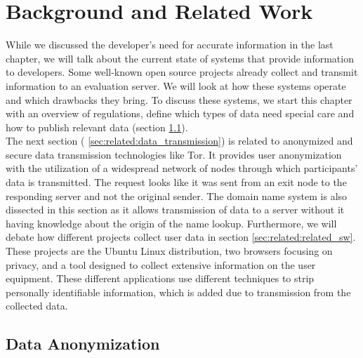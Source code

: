 \chapter{Background and Related Work}
\label{chap:related_work}
%

While we discussed the developer's need for accurate information in the last chapter, we will talk about the current state of systems that provide information to developers. Some well-known open source projects already collect and transmit information to an evaluation server. We will look at how these systems operate and which drawbacks they bring.
To discuss these systems, we start this chapter with an overview of regulations, define which types of data need special care and how to publish relevant data (section \ref{sec:related:data_aononymization}).\\ 
The next section ( \ref{sec:related:data_transmission}) is related to anonymized and secure data transmission technologies like Tor. It provides user anonymization with the utilization of a widespread network of nodes through which participants' data is transmitted. The request looks like it was sent from an exit node to the responding server and not the original sender. The domain name system is also dissected in this section as it allows transmission of data to a server without it having knowledge about the origin of the name lookup.
Furthermore, we will debate how different projects collect user data in section \ref{sec:related:related_sw}. These projects are the Ubuntu Linux distribution, two browsers focusing on privacy, and a tool designed to collect extensive information on the user equipment.
These different applications use different techniques to strip personally identifiable information, which is added due to transmission from the collected data.

\newpage

\section{Data Anonymization}
    \label{sec:related:data_aononymization}
    
